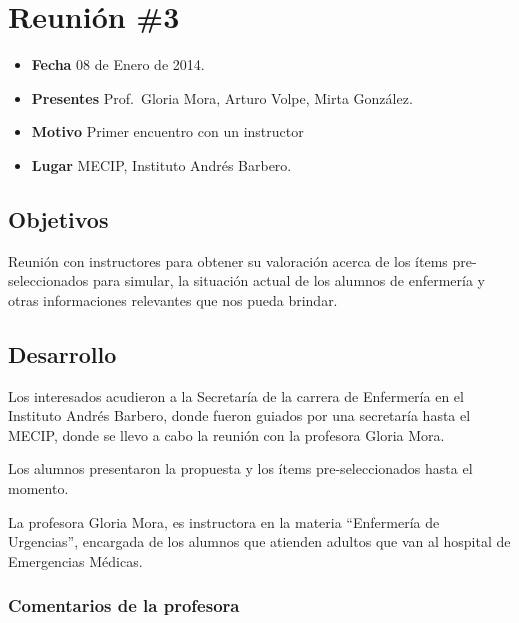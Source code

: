 \section{Reunión \#3}\label{reuniuxf3n-3}

\begin{itemize}
\itemsep1pt\parskip0pt
\item
  \textbf{Fecha} 08 de Enero de 2014.
\item
  \textbf{Presentes} Prof.~Gloria Mora, Arturo Volpe, Mirta González.
\item
  \textbf{Motivo} Primer encuentro con un instructor
\item
  \textbf{Lugar} MECIP, Instituto Andrés Barbero.
\end{itemize}

\subsection{Objetivos}\label{objetivos}

Reunión con instructores para obtener su valoración acerca de los ítems
pre-seleccionados para simular, la situación actual de los alumnos de
enfermería y otras informaciones relevantes que nos pueda brindar.

\subsection{Desarrollo}\label{desarrollo}

Los interesados acudieron a la Secretaría de la carrera de Enfermería en
el Instituto Andrés Barbero, donde fueron guiados por una secretaría
hasta el MECIP, donde se llevo a cabo la reunión con la profesora Gloria
Mora.

Los alumnos presentaron la propuesta y los ítems pre-seleccionados hasta
el momento.

La profesora Gloria Mora, es instructora en la materia ``Enfermería de
Urgencias'', encargada de los alumnos que atienden adultos que van al
hospital de Emergencias Médicas.

\subsubsection{Comentarios de la
profesora}\label{comentarios-de-la-profesora}

